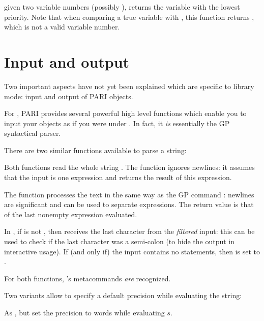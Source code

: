  given two variable numbers (possibly
), returns the variable with the lowest priority. Note
that when comparing a true variable with , this function
returns , which is not a valid variable number.

\section{Input and output}

\noindent
Two important aspects have not yet been explained which are specific to
library mode: input and output of PARI objects.


\noindent
For , PARI provides several powerful high level functions
which enable you to input your objects as if you were under . In fact,
it \emph{is} essentially the GP syntactical parser.

There are two similar functions available to parse a string:

\label{se:gp_read_str}


\noindent
Both functions read the whole string . The function
 ignores newlines: it assumes that the input is one
expression and returns the result of this expression.

The function  processes the text in the
same way as the GP command : newlines are significant and can
be used to separate expressions.
The return value is that of the last nonempty expression evaluated.

In , if  is not ,
then  receives the last character from the \emph{filtered}
input: this can be used to check if the last character was a semi-colon
(to hide the output in interactive usage). If (and only if) the
input contains no statements, then  is set to .

For both functions, 's metacommands \emph{are} recognized.

Two variants allow to specify a default precision while evaluating the
string:

As , but set the precision to  words while evaluating $s$.

